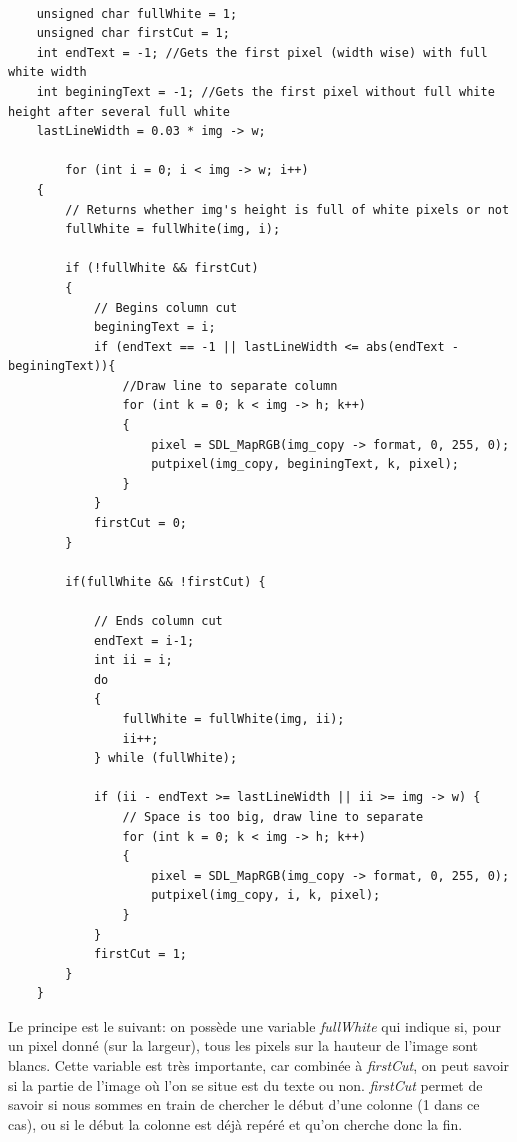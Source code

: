 \documentclass{article}
\begin{document}
    \begin{lstlisting}
    
    unsigned char fullWhite = 1;
    unsigned char firstCut = 1;
    int endText = -1; //Gets the first pixel (width wise) with full white width
    int beginingText = -1; //Gets the first pixel without full white height after several full white 
    lastLineWidth = 0.03 * img -> w;
    
		for (int i = 0; i < img -> w; i++) 
    {
        // Returns whether img's height is full of white pixels or not
        fullWhite = fullWhite(img, i);

        if (!fullWhite && firstCut)
        {   
            // Begins column cut
            beginingText = i;
            if (endText == -1 || lastLineWidth <= abs(endText - beginingText)){
                //Draw line to separate column
                for (int k = 0; k < img -> h; k++)
                {
                    pixel = SDL_MapRGB(img_copy -> format, 0, 255, 0);
                    putpixel(img_copy, beginingText, k, pixel);
                }   
            }
            firstCut = 0;
        }
        
        if(fullWhite && !firstCut) {
        
            // Ends column cut
            endText = i-1;
            int ii = i;
            do
            {
                fullWhite = fullWhite(img, ii);
                ii++;
            } while (fullWhite);
            
            if (ii - endText >= lastLineWidth || ii >= img -> w) {
                // Space is too big, draw line to separate
                for (int k = 0; k < img -> h; k++)
                {
                    pixel = SDL_MapRGB(img_copy -> format, 0, 255, 0);
                    putpixel(img_copy, i, k, pixel);
                }
            }
            firstCut = 1;
        }
    }	
	\end{lstlisting}
	\vspace*{0.5cm}
	\par
	Le principe est le suivant: on possède une variable \textit{fullWhite} qui indique si, pour un pixel donné (sur la largeur), tous les pixels sur la hauteur de l'image sont blancs. Cette variable est très importante, car combinée à \textit{firstCut}, on peut savoir si la partie de l'image où l'on se situe est du texte ou non. \textit{firstCut} permet de savoir si nous sommes en train de chercher le début d'une colonne (1 dans ce cas), ou si le début la colonne est déjà repéré et qu'on cherche donc la fin.
	
\end{document}

